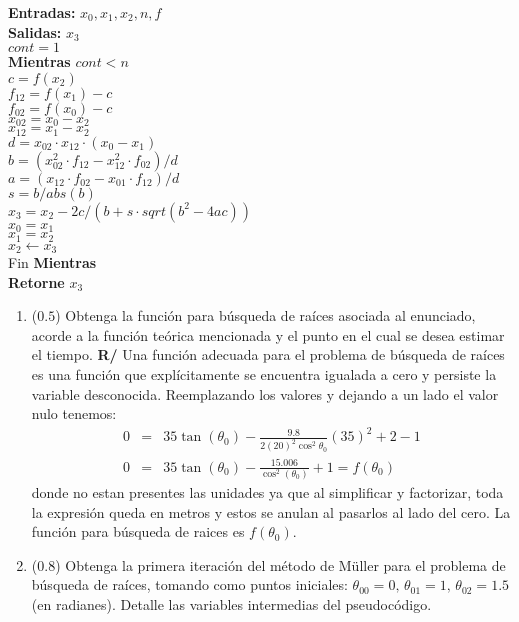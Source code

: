 \documentclass[12pt]{article}
\begin{document}
\begin{enumerate}[leftmargin=*,widest=9]
{\scriptsize
\textbf{Entradas:} \(x_0, x_1, x_2, n, f\)\\
\textbf{Salidas:} \(x_3\)\\
\(cont = 1\)\\
\textbf{Mientras} \(cont < n\)\\
\(c = f(x_2)\)\\
\(f_{12} = f(x_1) - c\)\\
\(f_{02} = f(x_0) - c\)\\
\(x_{02} = x_0 - x_2\)\\
\(x_{12} = x_1 - x_2\)\\
\(d = x_{02} \cdot x_{12} \cdot (x_0 - x_1)\)\\
\(b = (x_{02}^2 \cdot f_{12} - x_{12}^2 \cdot f_{02}) / d\)\\
\(a = (x_{12} \cdot f_{02} - x_{01} \cdot f_{12}) / d\)\\
\(s = b / abs(b)\)\\
\(x_3 = x_2 - 2 c / (b + s \cdot sqrt(b^2 - 4 a c))\)\\
\(x_0 = x_1\)\\
\(x_1 = x_2\)\\
\(x_2 \leftarrow x_3\)\\
Fin \textbf{Mientras}\\
\textbf{Retorne} \(x_3\)\\
}
\vspace{-.8cm}
\begin{enumerate}[label=\alph*]
\item (\(0.5\)) Obtenga la función para búsqueda de raíces asociada al enunciado, acorde a la función teórica mencionada y el punto en el cual se desea estimar el tiempo.
\textbf{R/} Una función adecuada para el problema de búsqueda de raíces es una función que explícitamente se encuentra igualada a cero y persiste la variable desconocida. Reemplazando los valores y dejando a un lado el valor nulo tenemos:
\begin{eqnarray*}
0&=&35\tan(\theta_{0}) - \frac{9.8}{2(20)^{2}\cos^{2}\theta_{0}}(35)^{2}+2 - 1 \\
0&=&35\tan(\theta_{0}) - \frac{15.006}{\cos^{2}(\theta_{0})} + 1 = f(\theta_0)
\end{eqnarray*}
donde no estan presentes las unidades ya que al simplificar y factorizar, toda la expresión queda en metros y estos se anulan al pasarlos al lado del cero. La función para búsqueda de raices es \(f(\theta_0)\).
\item (\(0.8\)) Obtenga la primera iteración del método de Müller para el problema de búsqueda de raíces, tomando como puntos iniciales: \(\theta_{00}=0,\, \theta_{01}=1,\, \theta_{02}=1.5\) (en radianes). Detalle las variables intermedias del pseudocódigo.

\end{enumerate}
\end{enumerate}
\end{document}
